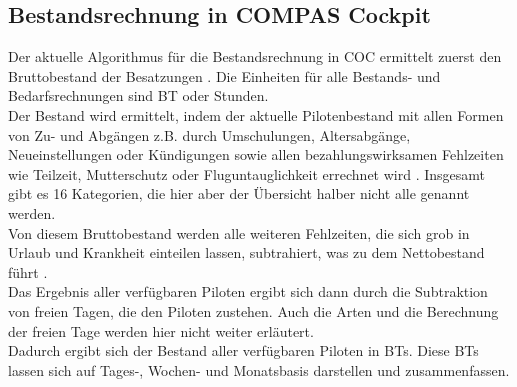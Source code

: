 \documentclass [12pt, a4paper, oneside, titlepage, ngerman]{article}
\begin{document}
\subsection{Bestandsrechnung in COMPAS Cockpit} \label{bestandsrechnung}
Der aktuelle Algorithmus für die Bestandsrechnung in \ac{COC} ermittelt zuerst den Bruttobestand der Besatzungen \cite[vgl.][S.8]{capfunc}. Die Einheiten für alle Bestands- und Bedarfsrechnungen sind \ac{BT} oder Stunden. \\
Der Bestand wird ermittelt, indem der aktuelle Pilotenbestand mit allen Formen von Zu- und Abgängen z.B. durch Umschulungen, Altersabgänge, Neueinstellungen oder Kündigungen sowie allen bezahlungswirksamen Fehlzeiten wie Teilzeit, Mutterschutz oder Fluguntauglichkeit errechnet wird \cite[vgl.][S.19]{benutzerhandbuch}. Insgesamt gibt es 16 Kategorien, die hier aber der Übersicht halber nicht alle genannt werden. \\
Von diesem Bruttobestand werden alle weiteren Fehlzeiten, die sich grob in Urlaub und Krankheit einteilen lassen, subtrahiert, was zu dem Nettobestand führt \cite[vgl.][S.8]{capfunc}. \\
Das Ergebnis aller verfügbaren Piloten ergibt sich dann durch die Subtraktion von freien Tagen, die den Piloten zustehen. Auch die Arten und die Berechnung der freien Tage werden hier nicht weiter erläutert. \\
Dadurch ergibt sich der Bestand aller verfügbaren Piloten in \acp{BT}. Diese \acp{BT} lassen sich auf Tages-, Wochen- und Monatsbasis darstellen und zusammenfassen. 
\end{document}
